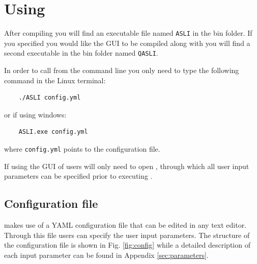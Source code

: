 \section{Using \asli} \label{sec:run}
After compiling \asli{} you will find an executable file named \texttt{ASLI} in the bin folder. If you specified you would like the GUI to be compiled along with \asli{} you will find a second executable in the bin folder named \texttt{QASLI}.


In order to call \asli{} from the command line you only need to type the following command in the Linux terminal:
\begin{verbatim}
	./ASLI config.yml
\end{verbatim}
or if using windows:
\begin{verbatim}
	ASLI.exe config.yml
\end{verbatim}
where \texttt{config.yml} points to the configuration file.

If using the GUI of \asli{} users will only need to open \qasli{}, through which all user input parameters can be specified prior to executing \asli{}.

\subsection{Configuration file} \label{sec:configuration}
\asli{} makes use of a YAML configuration file that can be edited in any text editor. Through this file users can specify the user input parameters. The structure of the configuration file is shown in Fig. \ref{fig:config} while a detailed description of each input parameter can be found in Appendix \ref{sec:parameters}.


